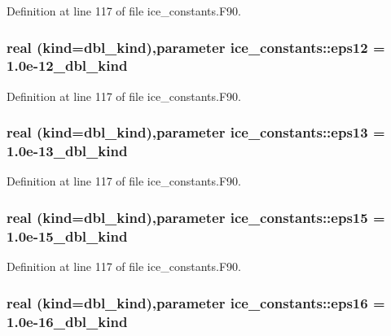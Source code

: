 Definition at line 117 of file ice\_\-constants.F90.\hypertarget{namespaceice__constants_af654cc2413a18dc60cad29fbca635544}{
\subsubsection[{eps12}]{\setlength{\rightskip}{0pt plus 5cm}real (kind=dbl\_\-kind),parameter {\bf ice\_\-constants::eps12} = 1.0e-\/12\_\-dbl\_\-kind}}
\label{namespaceice__constants_af654cc2413a18dc60cad29fbca635544}


Definition at line 117 of file ice\_\-constants.F90.\hypertarget{namespaceice__constants_a835bbe6345af20f392af6fe0435418df}{
\subsubsection[{eps13}]{\setlength{\rightskip}{0pt plus 5cm}real (kind=dbl\_\-kind),parameter {\bf ice\_\-constants::eps13} = 1.0e-\/13\_\-dbl\_\-kind}}
\label{namespaceice__constants_a835bbe6345af20f392af6fe0435418df}


Definition at line 117 of file ice\_\-constants.F90.\hypertarget{namespaceice__constants_a9ed2ee5022e4e58858972ed5dc16f9c2}{
\subsubsection[{eps15}]{\setlength{\rightskip}{0pt plus 5cm}real (kind=dbl\_\-kind),parameter {\bf ice\_\-constants::eps15} = 1.0e-\/15\_\-dbl\_\-kind}}
\label{namespaceice__constants_a9ed2ee5022e4e58858972ed5dc16f9c2}


Definition at line 117 of file ice\_\-constants.F90.\hypertarget{namespaceice__constants_a31903ce34884165d6861b9004305bc01}{
\subsubsection[{eps16}]{\setlength{\rightskip}{0pt plus 5cm}real (kind=dbl\_\-kind),parameter {\bf ice\_\-constants::eps16} = 1.0e-\/16\_\-dbl\_\-kind}}
\label{namespaceice__constants_a31903ce34884165d6861b9004305bc01}


